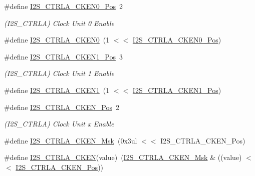 \begin{DoxyCompactItemize}
\item 
\#define \mbox{\hyperlink{group___s_a_m_d21___i2_s_ga7d77c4b6486ab5045b81fc091b9e338d}{I2\+S\+\_\+\+C\+T\+R\+L\+A\+\_\+\+C\+K\+E\+N0\+\_\+\+Pos}}~2
\begin{DoxyCompactList}\small\item\em (I2\+S\+\_\+\+C\+T\+R\+LA) Clock Unit 0 Enable \end{DoxyCompactList}\item 
\#define \mbox{\hyperlink{group___s_a_m_d21___i2_s_ga2f4c150a112be4da696c969952c910d9}{I2\+S\+\_\+\+C\+T\+R\+L\+A\+\_\+\+C\+K\+E\+N0}}~(1 $<$$<$ \mbox{\hyperlink{group___s_a_m_d21___i2_s_ga7d77c4b6486ab5045b81fc091b9e338d}{I2\+S\+\_\+\+C\+T\+R\+L\+A\+\_\+\+C\+K\+E\+N0\+\_\+\+Pos}})
\item 
\#define \mbox{\hyperlink{group___s_a_m_d21___i2_s_ga8e21e63a40f88a9e5ec0542ff8df23c0}{I2\+S\+\_\+\+C\+T\+R\+L\+A\+\_\+\+C\+K\+E\+N1\+\_\+\+Pos}}~3
\begin{DoxyCompactList}\small\item\em (I2\+S\+\_\+\+C\+T\+R\+LA) Clock Unit 1 Enable \end{DoxyCompactList}\item 
\#define \mbox{\hyperlink{group___s_a_m_d21___i2_s_gadd6b7ad6d9052a5d24d9ece5e040026b}{I2\+S\+\_\+\+C\+T\+R\+L\+A\+\_\+\+C\+K\+E\+N1}}~(1 $<$$<$ \mbox{\hyperlink{group___s_a_m_d21___i2_s_ga8e21e63a40f88a9e5ec0542ff8df23c0}{I2\+S\+\_\+\+C\+T\+R\+L\+A\+\_\+\+C\+K\+E\+N1\+\_\+\+Pos}})
\item 
\#define \mbox{\hyperlink{group___s_a_m_d21___i2_s_ga8c61333786563ab2ed03bfb976fc4e74}{I2\+S\+\_\+\+C\+T\+R\+L\+A\+\_\+\+C\+K\+E\+N\+\_\+\+Pos}}~2
\begin{DoxyCompactList}\small\item\em (I2\+S\+\_\+\+C\+T\+R\+LA) Clock Unit x Enable \end{DoxyCompactList}\item 
\#define \mbox{\hyperlink{group___s_a_m_d21___i2_s_ga2cd22fd7f0233a0731fab67198c9caab}{I2\+S\+\_\+\+C\+T\+R\+L\+A\+\_\+\+C\+K\+E\+N\+\_\+\+Msk}}~(0x3ul $<$$<$ I2\+S\+\_\+\+C\+T\+R\+L\+A\+\_\+\+C\+K\+E\+N\+\_\+\+Pos)
\item 
\#define \mbox{\hyperlink{group___s_a_m_d21___i2_s_gae551d4a28e1d7fef6423f5f1ab175748}{I2\+S\+\_\+\+C\+T\+R\+L\+A\+\_\+\+C\+K\+EN}}(value)~(\mbox{\hyperlink{group___s_a_m_d21___i2_s_ga2cd22fd7f0233a0731fab67198c9caab}{I2\+S\+\_\+\+C\+T\+R\+L\+A\+\_\+\+C\+K\+E\+N\+\_\+\+Msk}} \& ((value) $<$$<$ \mbox{\hyperlink{group___s_a_m_d21___i2_s_ga8c61333786563ab2ed03bfb976fc4e74}{I2\+S\+\_\+\+C\+T\+R\+L\+A\+\_\+\+C\+K\+E\+N\+\_\+\+Pos}}))

\end{DoxyCompactItemize}
